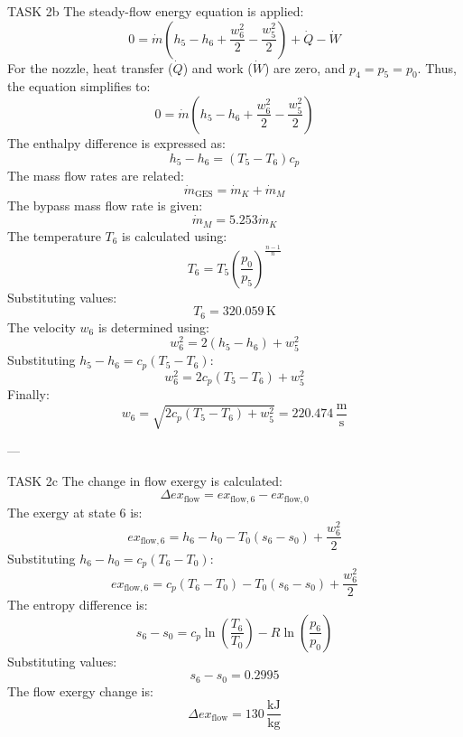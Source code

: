 TASK 2b  
The steady-flow energy equation is applied:  
\[
0 = \dot{m} (h_5 - h_6 + \frac{w_6^2}{2} - \frac{w_5^2}{2}) + \dot{Q} - \dot{W}
\]  
For the nozzle, heat transfer (\( \dot{Q} \)) and work (\( \dot{W} \)) are zero, and \( p_4 = p_5 = p_0 \). Thus, the equation simplifies to:  
\[
0 = \dot{m} (h_5 - h_6 + \frac{w_6^2}{2} - \frac{w_5^2}{2})
\]  
The enthalpy difference is expressed as:  
\[
h_5 - h_6 = (T_5 - T_6) c_p
\]  
The mass flow rates are related:  
\[
\dot{m}_{\text{GES}} = \dot{m}_K + \dot{m}_M
\]  
The bypass mass flow rate is given:  
\[
\dot{m}_M = 5.253 \dot{m}_K
\]  
The temperature \( T_6 \) is calculated using:  
\[
T_6 = T_5 \left( \frac{p_0}{p_5} \right)^{\frac{n-1}{n}}
\]  
Substituting values:  
\[
T_6 = 320.059 \, \text{K}
\]  
The velocity \( w_6 \) is determined using:  
\[
w_6^2 = 2 (h_5 - h_6) + w_5^2
\]  
Substituting \( h_5 - h_6 = c_p (T_5 - T_6) \):  
\[
w_6^2 = 2 c_p (T_5 - T_6) + w_5^2
\]  
Finally:  
\[
w_6 = \sqrt{2 c_p (T_5 - T_6) + w_5^2} = 220.474 \, \frac{\text{m}}{\text{s}}
\]  

---

TASK 2c  
The change in flow exergy is calculated:  
\[
\Delta ex_{\text{flow}} = ex_{\text{flow},6} - ex_{\text{flow},0}
\]  
The exergy at state 6 is:  
\[
ex_{\text{flow},6} = h_6 - h_0 - T_0 (s_6 - s_0) + \frac{w_6^2}{2}
\]  
Substituting \( h_6 - h_0 = c_p (T_6 - T_0) \):  
\[
ex_{\text{flow},6} = c_p (T_6 - T_0) - T_0 (s_6 - s_0) + \frac{w_6^2}{2}
\]  
The entropy difference is:  
\[
s_6 - s_0 = c_p \ln \left( \frac{T_6}{T_0} \right) - R \ln \left( \frac{p_6}{p_0} \right)
\]  
Substituting values:  
\[
s_6 - s_0 = 0.2995
\]  
The flow exergy change is:  
\[
\Delta ex_{\text{flow}} = 130 \, \frac{\text{kJ}}{\text{kg}}
\]